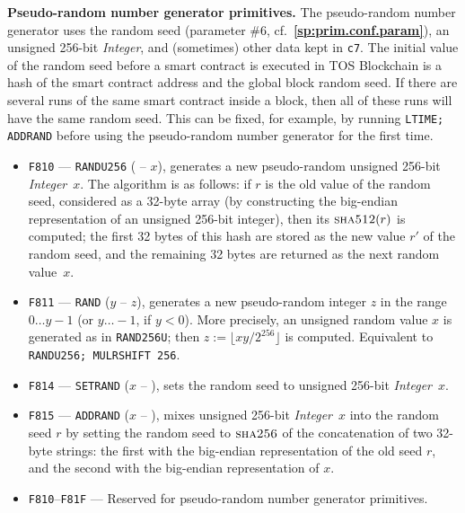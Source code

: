 \documentclass[12pt,oneside]{article}
\def\makepoint#1{\medbreak\noindent{\bf #1.\ }}
\def\nxsubpoint{\refstepcounter{subsubsection}%
  \smallbreak\makepoint{\thesubsubsection}}
\def\refpoint#1{{\rm\textbf{\ref{#1}}}}
\let\ptref=\refpoint
\def\emb#1{\textbf{#1.}}
\def\opsc#1{\operatorname{\textsc{#1}}}
\def\Sha{\opsc{sha256}}
\begin{document}
\nxsubpoint\emb{Pseudo-random number generator primitives}
The pseudo-random number generator uses the random seed (parameter \#6, cf.~\ptref{sp:prim.conf.param}), an unsigned 256-bit {\em Integer}, and (sometimes) other data kept in {\tt c7}. The initial value of the random seed before a smart contract is executed in TOS Blockchain is a hash of the smart contract address and the global block random seed. If there are several runs of the same smart contract inside a block, then all of these runs will have the same random seed. This can be fixed, for example, by running {\tt LTIME; ADDRAND} before using the pseudo-random number generator for the first time.
\begin{itemize}
\item {\tt F810} --- {\tt RANDU256} ( -- $x$), generates a new pseudo-random unsigned 256-bit {\em Integer}~$x$. The algorithm is as follows: if $r$ is the old value of the random seed, considered as a 32-byte array (by constructing the big-endian representation of an unsigned 256-bit integer), then its $\opsc{sha512}(r)$ is computed; the first 32 bytes of this hash are stored as the new value $r'$ of the random seed, and the remaining 32 bytes are returned as the next random value~$x$.
\item {\tt F811} --- {\tt RAND} ($y$ -- $z$), generates a new pseudo-random integer $z$ in the range $0\ldots y-1$ (or $y\ldots-1$, if $y<0$). More precisely, an unsigned random value $x$ is generated as in {\tt RAND256U}; then $z:=\lfloor xy/2^{256}\rfloor$ is computed. Equivalent to {\tt RANDU256; MULRSHIFT 256}.
\item {\tt F814} --- {\tt SETRAND} ($x$ -- ), sets the random seed to unsigned 256-bit {\em Integer\/}~$x$.
\item {\tt F815} --- {\tt ADDRAND} ($x$ -- ), mixes unsigned 256-bit {\em Integer\/}~$x$ into the random seed $r$ by setting the random seed to $\Sha$ of the concatenation of two 32-byte strings: the first with the big-endian representation of the old seed $r$, and the second with the big-endian representation of $x$.
\item {\tt F810}--{\tt F81F} --- Reserved for pseudo-random number generator primitives.
\end{itemize}
\end{document}
